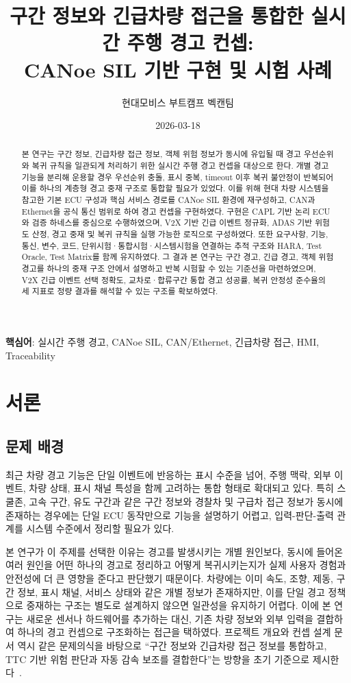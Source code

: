 \documentclass[11pt,a4paper]{article}
\title{구간 정보와 긴급차량 접근을 통합한 실시간 주행 경고 컨셉:\\CANoe SIL 기반 구현 및 시험 사례}
\author{현대모비스 부트캠프 벡캔팀}
\date{2026-03-18}
\begin{document}
\maketitle

\begin{abstract}
본 연구는 구간 정보, 긴급차량 접근 정보, 객체 위험 정보가 동시에 유입될 때 경고 우선순위와 복귀 규칙을 일관되게 처리하기 위한 실시간 주행 경고 컨셉을 대상으로 한다. 개별 경고 기능을 분리해 운용할 경우 우선순위 충돌, 표시 중복, timeout 이후 복귀 불안정이 반복되어 이를 하나의 계층형 경고 중재 구조로 통합할 필요가 있었다. 이를 위해 현대 차량 시스템을 참고한 기본 ECU 구성과 핵심 서비스 경로를 CANoe SIL 환경에 재구성하고, CAN과 Ethernet을 공식 통신 범위로 하여 경고 컨셉을 구현하였다. 구현은 CAPL 기반 논리 ECU와 검증 하네스를 중심으로 수행하였으며, V2X 기반 긴급 이벤트 정규화, ADAS 기반 위험도 산정, 경고 중재 및 복귀 규칙을 실행 가능한 로직으로 구성하였다. 또한 요구사항, 기능, 통신, 변수, 코드, 단위시험·통합시험·시스템시험을 연결하는 추적 구조와 HARA, Test Oracle, Test Matrix를 함께 유지하였다. 그 결과 본 연구는 구간 경고, 긴급 경고, 객체 위험 경고를 하나의 중재 구조 안에서 설명하고 반복 시험할 수 있는 기준선을 마련하였으며, V2X 긴급 이벤트 선택 정확도, 교차로·합류구간 통합 경고 성공률, 복귀 안정성 준수율의 세 지표로 정량 결과를 해석할 수 있는 구조를 확보하였다.
\end{abstract}

\noindent\textbf{핵심어}: 실시간 주행 경고, CANoe SIL, CAN/Ethernet, 긴급차량 접근, HMI, Traceability

\tableofcontents

\section{서론}

\subsection{문제 배경}

최근 차량 경고 기능은 단일 이벤트에 반응하는 표시 수준을 넘어, 주행 맥락, 외부 이벤트, 차량 상태, 표시 채널 특성을 함께 고려하는 통합 형태로 확대되고 있다. 특히 스쿨존, 고속 구간, 유도 구간과 같은 구간 정보와 경찰차 및 구급차 접근 정보가 동시에 존재하는 경우에는 단일 ECU 동작만으로 기능을 설명하기 어렵고, 입력-판단-출력 관계를 시스템 수준에서 정리할 필요가 있다.

본 연구가 이 주제를 선택한 이유는 경고를 발생시키는 개별 원인보다, 동시에 들어온 여러 원인을 어떤 하나의 경고로 정리하고 어떻게 복귀시키는지가 실제 사용자 경험과 안전성에 더 큰 영향을 준다고 판단했기 때문이다. 차량에는 이미 속도, 조향, 제동, 구간 정보, 표시 채널, 서비스 상태와 같은 개별 정보가 존재하지만, 이를 단일 경고 정책으로 중재하는 구조는 별도로 설계하지 않으면 일관성을 유지하기 어렵다. 이에 본 연구는 새로운 센서나 하드웨어를 추가하는 대신, 기존 차량 정보와 외부 입력을 결합하여 하나의 경고 컨셉으로 구조화하는 접근을 택하였다. 프로젝트 개요와 컨셉 설계 문서 역시 같은 문제의식을 바탕으로 ``구간 정보와 긴급차량 접근 정보를 통합하고, TTC 기반 위험 판단과 자동 감속 보조를 결합한다''는 방향을 초기 기준으로 제시한다~\cite{proj_overview,concept_design}.
\end{document}
